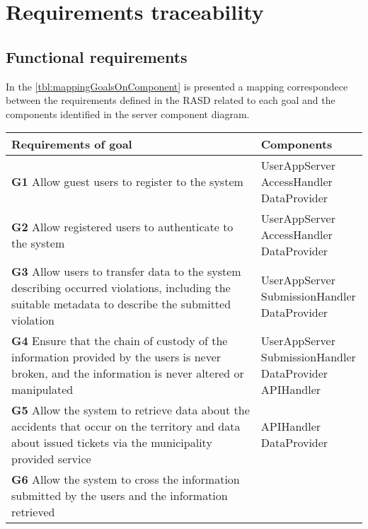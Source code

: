 \section{Requirements traceability}

    \subsection{Functional requirements}

        In the \autoref{tbl:mappingGoalsOnComponent} is presented a mapping correspondece between the requirements defined in the RASD
        related to each goal and the components identified in the server component diagram.\\

        \begin{longtable}{p{0.7\linewidth}p{0.3\linewidth}}
            \toprule
                \textbf{Requirements of goal} & \textbf{Components}\\
            \midrule
                \textbf{G1} Allow guest users to register to the system 
                    & \mbox{UserAppServer} \mbox{AccessHandler} \mbox{DataProvider}\\
            \midrule
                \textbf{G2} Allow registered users to authenticate to the system 
                    & \mbox{UserAppServer} \mbox{AccessHandler} \mbox{DataProvider}\\
            \midrule
                \textbf{G3} Allow users to transfer data to the system describing occurred violations,
                 including the suitable metadata to describe the submitted violation 
                 & \mbox{UserAppServer} \mbox{SubmissionHandler} \mbox{DataProvider}\\
            \midrule
                \textbf{G4} Ensure that the chain of custody of the information provided by the users is never broken, 
                and the information is never altered or manipulated 
                & \mbox{UserAppServer} \mbox{SubmissionHandler} \mbox{DataProvider}  \mbox{APIHandler}\\
            \midrule
                \textbf{G5} Allow the system to retrieve data about the accidents that occur on the territory and data 
                about issued tickets via the municipality provided service 
                & \mbox{APIHandler} \mbox{DataProvider}\\
            \midrule
                \textbf{G6} Allow the system to cross the information submitted by the users and the information retrieved 

\end{longtable}
